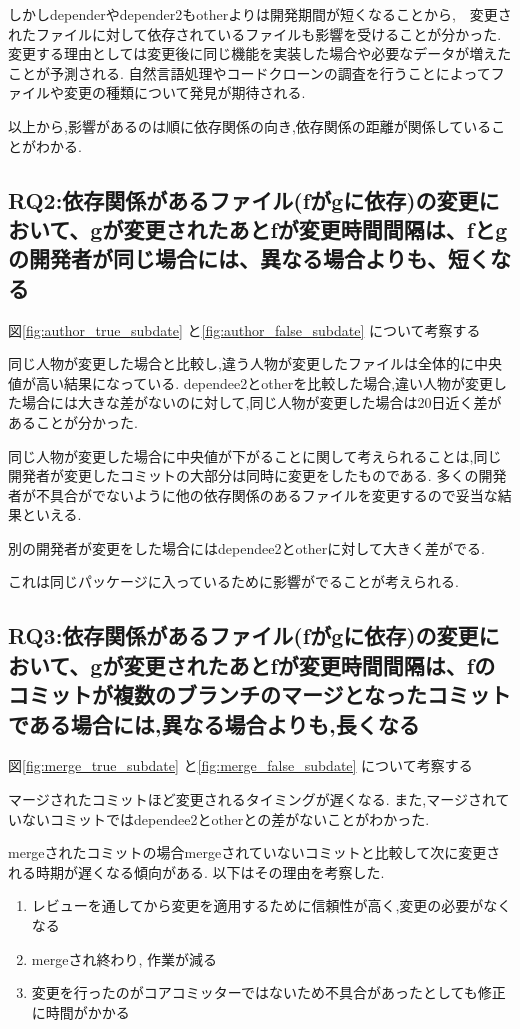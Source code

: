 \documentclass{fose2016}           %
\begin{document}
しかしdependerやdepender2もotherよりは開発期間が短くなることから,　変更されたファイルに対して依存されているファイルも影響を受けることが分かった.
変更する理由としては変更後に同じ機能を実装した場合や必要なデータが増えたことが予測される.
自然言語処理やコードクローンの調査を行うことによってファイルや変更の種類について発見が期待される.


以上から,影響があるのは順に依存関係の向き,依存関係の距離が関係していることがわかる.


\subsection{RQ2:依存関係があるファイル(fがgに依存)の変更において、gが変更されたあとfが変更時間間隔は、fとgの開発者が同じ場合には、異なる場合よりも、短くなる}
図\ref{fig:author_true_subdate} と\ref{fig:author_false_subdate} について考察する

同じ人物が変更した場合と比較し,違う人物が変更したファイルは全体的に中央値が高い結果になっている.
dependee2とotherを比較した場合,違い人物が変更した場合には大きな差がないのに対して,同じ人物が変更した場合は20日近く差があることが分かった.

同じ人物が変更した場合に中央値が下がることに関して考えられることは,同じ開発者が変更したコミットの大部分は同時に変更をしたものである.
多くの開発者が不具合がでないように他の依存関係のあるファイルを変更するので妥当な結果といえる.

別の開発者が変更をした場合にはdependee2とotherに対して大きく差がでる.

これは同じパッケージに入っているために影響がでることが考えられる.

\subsection{RQ3:依存関係があるファイル(fがgに依存)の変更において、gが変更されたあとfが変更時間間隔は、fのコミットが複数のブランチのマージとなったコミットである場合には,異なる場合よりも,長くなる}
図\ref{fig:merge_true_subdate} と\ref{fig:merge_false_subdate} について考察する

マージされたコミットほど変更されるタイミングが遅くなる.
また,マージされていないコミットではdependee2とotherとの差がないことがわかった.


mergeされたコミットの場合mergeされていないコミットと比較して次に変更される時期が遅くなる傾向がある.
以下はその理由を考察した.
\begin{enumerate}
\item レビューを通してから変更を適用するために信頼性が高く,変更の必要がなくなる
\item mergeされ終わり, 作業が減る
\item 変更を行ったのがコアコミッターではないため不具合があったとしても修正に時間がかかる
\end{enumerate}
\end{document}
